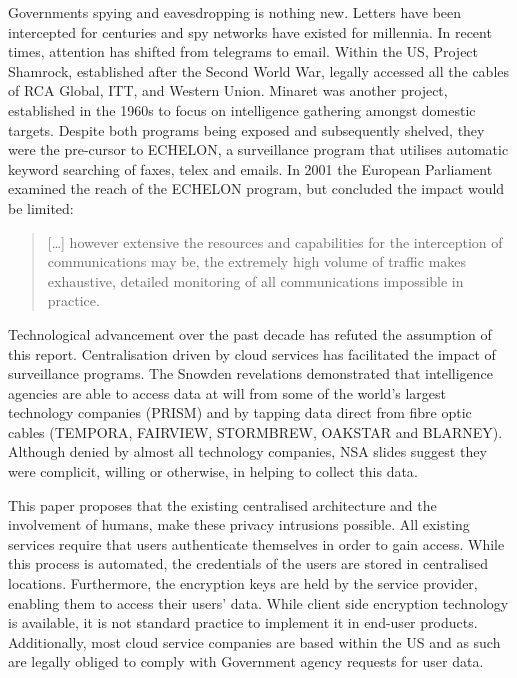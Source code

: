 \documentclass[twocolumn,english]{article}
\begin{document}
Governments spying and eavesdropping is nothing new\cite{bbc13}. Letters have been intercepted for centuries and spy networks have existed for millennia. In recent times, attention has shifted from
telegrams to email. Within the US, Project Shamrock, established after
the Second World War, legally accessed all the cables of RCA Global,
ITT, and Western Union. Minaret was another project, established in
the 1960s to focus on intelligence gathering amongst domestic targets. Despite both programs being exposed and subsequently shelved, they
were the pre-cursor to ECHELON, a surveillance program that utilises automatic
keyword searching of faxes, telex and emails.  In 2001 the European Parliament examined the reach of the ECHELON program, but concluded the impact would be limited\cite{Schmid01}: 
\begin{quote}
[\dots] however extensive the resources and capabilities for the interception of communications may be, the extremely high volume of traffic makes exhaustive, detailed monitoring of all communications impossible in practice.
\end{quote}
 
Technological advancement over the past decade has refuted the assumption of this report.  Centralisation driven by cloud services has facilitated the impact of surveillance programs. The Snowden revelations demonstrated that
intelligence agencies are able to access data at will from some of
the world\textquoteright s largest technology companies (PRISM) and
by tapping data direct from fibre optic cables (TEMPORA, FAIRVIEW,
STORMBREW, OAKSTAR and BLARNEY)\cite{guardianNSA}. Although denied by almost all technology companies, NSA slides suggest
they were complicit, willing or otherwise, in helping to collect this
data\cite{guardian13}.

This paper proposes that the existing centralised architecture and the involvement of humans, make these privacy
intrusions possible. All existing services require that users authenticate themselves in order to gain access.  While this process is automated, the credentials
of the users are stored in centralised locations. Furthermore, the
encryption keys are held by the service provider, enabling them to
access their users' data\cite{lambert12}. While client side encryption technology is available, it is not standard practice to implement it in end-user products. Additionally, most cloud service companies are based within the US and as such are legally obliged to comply with Government agency
requests for user data.
\end{document}
